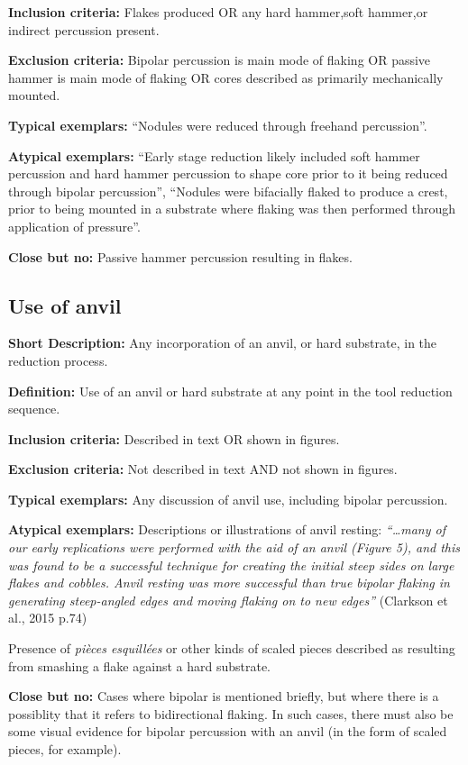 \documentclass[
]{article}
\begin{document}
\textbf{Inclusion criteria:} Flakes produced OR any hard hammer,soft
hammer,or indirect percussion present.

\textbf{Exclusion criteria:} Bipolar percussion is main mode of flaking
OR passive hammer is main mode of flaking OR cores described as
primarily mechanically mounted.

\textbf{Typical exemplars:} ``Nodules were reduced through freehand
percussion''.

\textbf{Atypical exemplars:} ``Early stage reduction likely included
soft hammer percussion and hard hammer percussion to shape core prior to
it being reduced through bipolar percussion'', ``Nodules were bifacially
flaked to produce a crest, prior to being mounted in a substrate where
flaking was then performed through application of pressure''.

\textbf{Close but no:} Passive hammer percussion resulting in flakes.

\subsection{Use of anvil}\label{use-of-anvil}

\textbf{Short Description:} Any incorporation of an anvil, or hard
substrate, in the reduction process.

\textbf{Definition:} Use of an anvil or hard substrate at any point in
the tool reduction sequence.

\textbf{Inclusion criteria:} Described in text OR shown in figures.

\textbf{Exclusion criteria:} Not described in text AND not shown in
figures.

\textbf{Typical exemplars:} Any discussion of anvil use, including
bipolar percussion.

\textbf{Atypical exemplars:} Descriptions or illustrations of anvil
resting: \emph{``\ldots many of our early replications were performed
with the aid of an anvil (Figure 5), and this was found to be a
successful technique for creating the initial steep sides on large
flakes and cobbles. Anvil resting was more successful than true bipolar
flaking in generating steep-angled edges and moving flaking on to new
edges''} (Clarkson et al., 2015 p.74)

Presence of \emph{pièces esquillées} or other kinds of scaled pieces
described as resulting from smashing a flake against a hard substrate.

\textbf{Close but no:} Cases where bipolar is mentioned briefly, but
where there is a possiblity that it refers to bidirectional flaking. In
such cases, there must also be some visual evidence for bipolar
percussion with an anvil (in the form of scaled pieces, for example).
\end{document}
